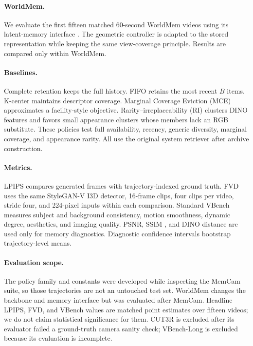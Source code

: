 \documentclass[10pt,twocolumn]{article}
\newcommand{\RI}{\textsc{RI}\xspace}
\begin{document}
\paragraph{WorldMem.}
We evaluate the first fifteen matched 60-second WorldMem videos using its
latent-memory interface \citep{worldmem}. The geometric controller is adapted
to the stored representation while keeping the same view-coverage principle.
Results are compared only within WorldMem.

\paragraph{Baselines.}
Complete retention keeps the full history. FIFO retains the most recent $B$
items. K-center maintains descriptor coverage. Marginal Coverage Eviction
(MCE) approximates a facility-style objective. Rarity--irreplaceability (\RI)
clusters DINO features and favors small appearance clusters whose members lack
an RGB substitute. These policies test full availability, recency, generic
diversity, marginal coverage, and appearance rarity. All use the original
system retriever after archive construction.

\paragraph{Metrics.}
LPIPS \citep{lpips} compares generated frames with trajectory-indexed ground
truth. FVD \citep{fvd} uses the same StyleGAN-V I3D detector, 16-frame clips,
four clips per video, stride four, and 224-pixel inputs within each comparison.
Standard VBench \citep{vbench} measures subject and background consistency,
motion smoothness, dynamic degree, aesthetics, and imaging quality. PSNR,
SSIM \citep{ssim}, and DINO distance \citep{dinov2} are used only for memory
diagnostics. Diagnostic confidence intervals bootstrap trajectory-level means.

\paragraph{Evaluation scope.}
The policy family and constants were developed while inspecting the MemCam
suite, so those trajectories are not an untouched test set. WorldMem changes
the backbone and memory interface but was evaluated after MemCam. Headline
LPIPS, FVD, and VBench values are matched point estimates over fifteen videos;
we do not claim statistical significance for them. CUT3R \citep{cut3r} is
excluded after its evaluator failed a ground-truth camera sanity check;
VBench-Long is excluded because its evaluation is incomplete.
\end{document}
